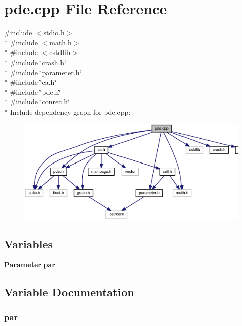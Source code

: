\section{pde.\-cpp File Reference}
\label{pde_8cpp}
{\ttfamily \#include $<$stdio.\-h$>$}\\*
{\ttfamily \#include $<$math.\-h$>$}\\*
{\ttfamily \#include $<$cstdlib$>$}\\*
{\ttfamily \#include \char`\"{}crash.\-h\char`\"{}}\\*
{\ttfamily \#include \char`\"{}parameter.\-h\char`\"{}}\\*
{\ttfamily \#include \char`\"{}ca.\-h\char`\"{}}\\*
{\ttfamily \#include \char`\"{}pde.\-h\char`\"{}}\\*
{\ttfamily \#include \char`\"{}conrec.\-h\char`\"{}}\\*
Include dependency graph for pde.\-cpp\-:
\nopagebreak
\begin{figure}[H]
\begin{center}
\leavevmode
\includegraphics[width=350pt]{pde_8cpp__incl}
\end{center}
\end{figure}
\subsection*{Variables}
\begin{DoxyCompactItemize}
\item 
{\bf Parameter} {\bf par}
\end{DoxyCompactItemize}


\subsection{Variable Documentation}
\subsubsection[{par}]{ par}\label{pde_8cpp_aa11a52593a908c20a7259a3e72c0b348}

